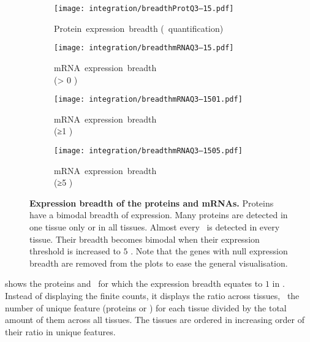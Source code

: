 \begin{figure}[!htb]
    \begin{subfigure}[h]{0.53\textwidth}
    \captionsetup{margin=0.6cm,justification=centering}
        \centering \texttt{[image: integration/breadthProtQ3--15.pdf]}
        \caption{Protein~expression~breadth (\PPKM~quantification)}\label{fig:protBreadth}
    \end{subfigure}
    \begin{subfigure}[h]{0.53\textwidth}
    \captionsetup{margin=0.6cm,justification=centering}
        \centering \texttt{[image: integration/breadthmRNAQ3--15.pdf]}
        \caption{mRNA~expression~breadth\\(> 0 \FPKM)}\label{fig:mRNAbreadth0}
    \end{subfigure}
    \vspace{2.5mm}

    \begin{subfigure}[b]{0.53\textwidth}
    \captionsetup{margin=0.6cm,justification=centering}
        \centering \texttt{[image: integration/breadthmRNAQ3--1501.pdf]}
        \caption{mRNA~expression~breadth\\(≥1 \FPKM)}\label{fig:mRNAbreadth1}
    \end{subfigure}
    \begin{subfigure}[b]{0.53\textwidth}
    \captionsetup{margin=0.6cm,justification=centering}
        \centering \texttt{[image: integration/breadthmRNAQ3--1505.pdf]}
        \caption{mRNA~expression~breadth\\(≥5 \FPKM)}\label{fig:mRNAbreadth5}
    \end{subfigure}
    \vspace{-5mm}
    \caption[Expression breadth of the proteins and mRNAs]{\label{fig:expressionBreadth}%
    \textbf{Expression breadth of the proteins and mRNAs.}
    Proteins have a bimodal breadth of expression.
    Many proteins are detected in one tissue only or in all tissues.
    Almost every \mRNA\ is detected in every tissue.
    Their breadth becomes bimodal when their expression threshold
    is increased to $5$ \FPKM{}.
    Note that the genes with null expression breadth are removed from the plots
    to ease the general visualisation.
    }
\end{figure}

 shows the proteins and \mRNAs\
for which the expression breadth equates to $1$ in .
Instead of displaying the finite counts,
it displays the ratio across tissues,
\ie\ the number of unique feature (proteins or \mRNAs)
for each tissue divided by the total amount of them across all tissues.
The tissues are ordered in increasing order of their ratio in unique features.

